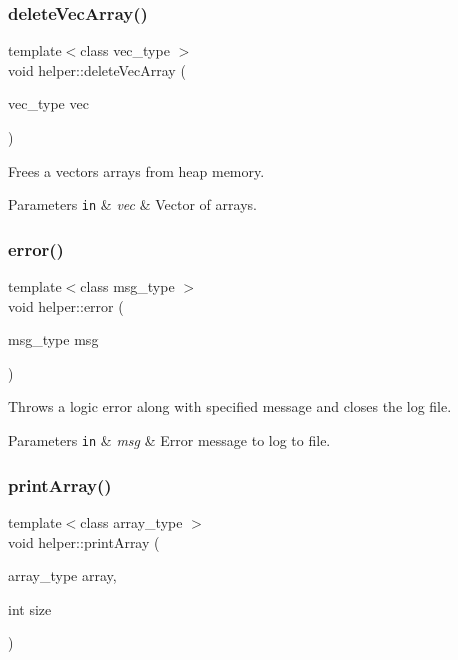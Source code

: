 \subsubsection{\texorpdfstring{delete\+Vec\+Array()}{deleteVecArray()}}
{\footnotesize\ttfamily template$<$class vec\+\_\+type $>$ \\
void helper\+::delete\+Vec\+Array (\begin{DoxyParamCaption}\item[{vec\+\_\+type}]{vec }\end{DoxyParamCaption})}

Frees a vector\textquotesingle{}s arrays from heap memory. 
\begin{DoxyParams}[1]{Parameters}
\mbox{\tt in}  & {\em vec} & Vector of arrays. \\
\hline
\end{DoxyParams}
\mbox{\label{Helper_8hh_file_a8511b1f612df58fa2d54b823cf6c1f7a}} 
\subsubsection{\texorpdfstring{error()}{error()}}
{\footnotesize\ttfamily template$<$class msg\+\_\+type $>$ \\
void helper\+::error (\begin{DoxyParamCaption}\item[{msg\+\_\+type}]{msg }\end{DoxyParamCaption})}

Throws a logic error along with specified message and closes the log file. 
\begin{DoxyParams}[1]{Parameters}
\mbox{\tt in}  & {\em msg} & Error message to log to file. \\
\hline
\end{DoxyParams}
\mbox{\label{Helper_8hh_file_ad3a9b9a5d8b46962dae72719f691201c}} 
\subsubsection{\texorpdfstring{print\+Array()}{printArray()}}
{\footnotesize\ttfamily template$<$class array\+\_\+type $>$ \\
void helper\+::print\+Array (\begin{DoxyParamCaption}\item[{array\+\_\+type}]{array,  }\item[{int}]{size }\end{DoxyParamCaption})}

